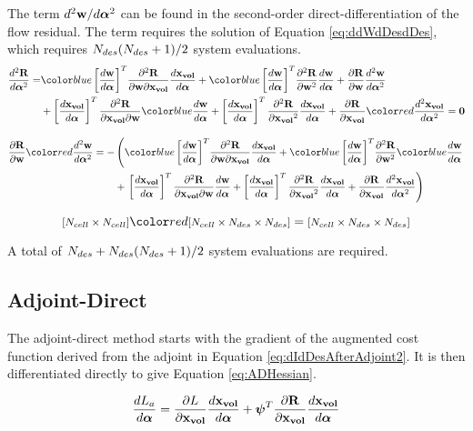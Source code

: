 \documentclass[letterpaper,12pt,]{article}
\begin{document}
The term $d^2\mathbf{w}/d\boldsymbol{\alpha}^2$ can be found in the second-order direct-differentiation of the flow residual.
The term requires the solution of Equation \ref{eq:ddWdDesdDes}, which requires $N_{des}(N_{des}+1)/2$ system evaluations.
\begin{equation}
\begin{split}
	\DDt{\bR}{\balfa} 
	=&
	\blue{\trans{\Dt{\bw}{\balfa}}}
	\ddelm{\bR}{\bw}{\xvol}
	\Dt{\xvol}{\balfa}
	+
	\blue{\trans{\Dt{\bw}{\balfa}}}
	\ddel{\bR}{\bw}
	\Dt{\bw}{\balfa}
	+
	\del{\bR}{\bw}
	\DDt{\bw}{\balfa}
	\\
	&+
	\trans{\Dt{\xvol}{\balfa}}
	\ddelm{\bR}{\xvol}{\bw}
	\blue{\Dt{\bw}{\balfa}}
	+
	\trans{\Dt{\xvol}{\balfa}}
	\ddel{\bR}{\xvol}
	\Dt{\xvol}{\balfa}
	+
	\del{\bR}{\xvol}
	\red{\DDt{\xvol}{\balfa}}
	=
	\mbf{0}
\label{eq:ddRdDesdDes}
\end{split}
\end{equation}

\begin{equation}
\begin{split}
	\del{\bR}{\bw}
	\red{\DDt{\bw}{\balfa}}
	=
	-
	&
	\left(
	\blue{\trans{\Dt{\bw}{\balfa}}}
	\ddelm{\bR}{\bw}{\xvol}
	\Dt{\xvol}{\balfa}
	+
	\blue{\trans{\Dt{\bw}{\balfa}}}
	\ddel{\bR}{\bw}
	\blue{\Dt{\bw}{\balfa}}
	\right.
	\\
	&+\left.
	\trans{\Dt{\xvol}{\balfa}}
	\ddelm{\bR}{\xvol}{\bw}
	\Dt{\bw}{\balfa}
	+
	\trans{\Dt{\xvol}{\balfa}}
	\ddel{\bR}{\xvol}
	\Dt{\xvol}{\balfa}
	+
	\del{\bR}{\xvol}
	\DDt{\xvol}{\balfa}
	\right)
\label{eq:ddWdDesdDes}
\end{split}
\end{equation}

\begin{equation}
	\nxn{\ncell}{\ncell}
	\red{\nxnxn{\ncell}{\ndes}{\ndes}}
	=
	\nxnxn{\ncell}{\ndes}{\ndes}
\end{equation}

A total of $N_{des} + N_{des}(N_{des}+1)/2$ system evaluations are required.

\newpage
\subsection*{Adjoint-Direct}
The adjoint-direct method starts with the gradient of the augmented cost function derived from the adjoint in Equation \ref{eq:dIdDesAfterAdjoint2}.
It is then differentiated directly to give Equation \ref{eq:ADHessian}.

\begin{equation}
	\dfrac{dL_a}{d\boldsymbol{\alpha}} = 
	\dfrac{\partial L}{\partial\mathbf{x_{vol}}}
	\dfrac{d\mathbf{x_{vol}}}{d\boldsymbol{\alpha}}
	+
	\boldsymbol{\psi}^T
	\dfrac{\partial\mathbf{R}}{\partial\mathbf{x_{vol}}}
	\dfrac{d\mathbf{x_{vol}}}{d\boldsymbol{\alpha}}
	\label{eq:dIdDesAfterAdjoint2}
\end{equation}
\end{document}

